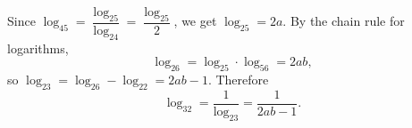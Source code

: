 Since $\log_45=\dfrac{\log_25}{\log_24}=\dfrac{\log_25}{2}$, we get $\log_25=2a$. By the chain rule for logarithms,
\[
\log_26=\log_25\cdot\log_56=2ab,
\]
so $\log_23=\log_26-\log_22=2ab-1$. Therefore
\[
\log_32=\dfrac{1}{\log_23}=\boxed{\dfrac{1}{2ab-1}}.
\]
